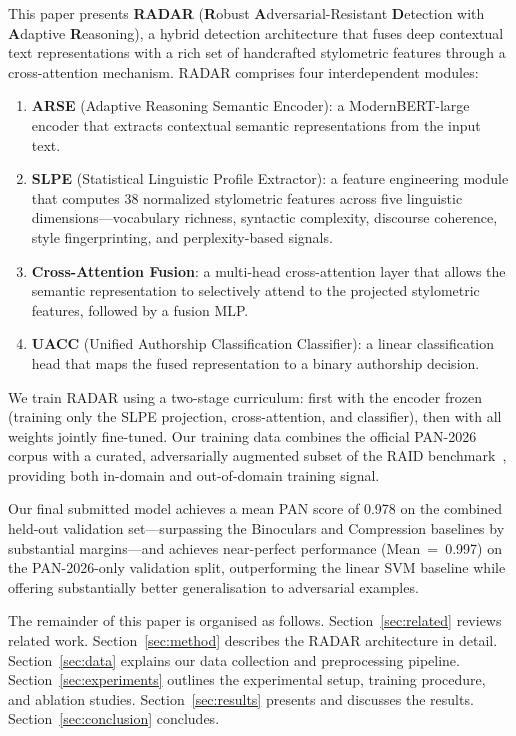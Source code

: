 This paper presents \textbf{RADAR} (\textbf{R}obust \textbf{A}dversarial-Resistant \textbf{D}etection
with \textbf{A}daptive \textbf{R}easoning), a hybrid detection architecture that fuses deep
contextual text representations with a rich set of handcrafted stylometric features through a
cross-attention mechanism. RADAR comprises four interdependent modules:

\begin{enumerate}
  \item \textbf{ARSE} (Adaptive Reasoning Semantic Encoder): a ModernBERT-large encoder
        that extracts contextual semantic representations from the input text.
  \item \textbf{SLPE} (Statistical Linguistic Profile Extractor): a feature engineering
        module that computes 38 normalized stylometric features across five linguistic
        dimensions—vocabulary richness, syntactic complexity, discourse coherence, style
        fingerprinting, and perplexity-based signals.
  \item \textbf{Cross-Attention Fusion}: a multi-head cross-attention layer that allows the
        semantic representation to selectively attend to the projected stylometric features,
        followed by a fusion MLP.
  \item \textbf{UACC} (Unified Authorship Classification Classifier): a linear classification
        head that maps the fused representation to a binary authorship decision.
\end{enumerate}

We train RADAR using a two-stage curriculum: first with the encoder frozen (training only
the SLPE projection, cross-attention, and classifier), then with all weights jointly
fine-tuned. Our training data combines the official PAN-2026 corpus with a curated,
adversarially augmented subset of the RAID benchmark~\cite{dugan:2024}, providing both
in-domain and out-of-domain training signal.

Our final submitted model achieves a mean PAN score of 0.978 on the combined held-out
validation set—surpassing the Binoculars and Compression baselines by substantial margins—and
achieves near-perfect performance (Mean~=~0.997) on the PAN-2026-only validation split,
outperforming the linear SVM baseline while offering substantially better generalisation to
adversarial examples.

The remainder of this paper is organised as follows. Section~\ref{sec:related} reviews related work.
Section~\ref{sec:method} describes the RADAR architecture in detail.
Section~\ref{sec:data} explains our data collection and preprocessing pipeline.
Section~\ref{sec:experiments} outlines the experimental setup, training procedure, and ablation studies.
Section~\ref{sec:results} presents and discusses the results.
Section~\ref{sec:conclusion} concludes.
